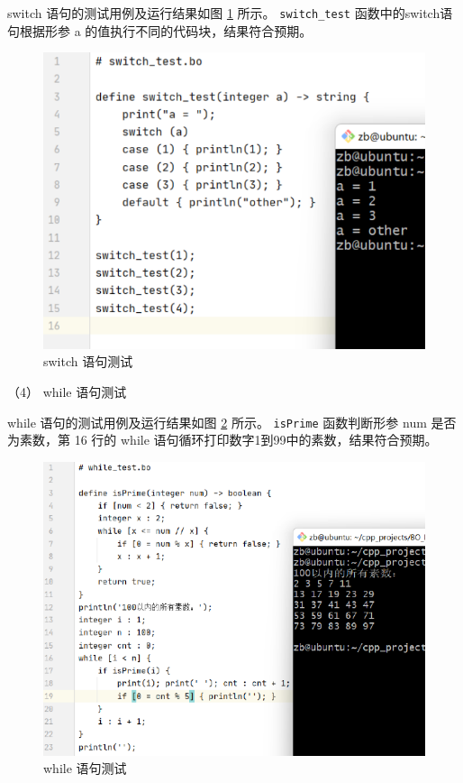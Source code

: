 switch 语句的测试用例及运行结果如图 \ref{fig_test_switch} 所示。 \verb|switch_test| 函数中的switch语句根据形参 a 的值执行不同的代码块，结果符合预期。

\begin{figure}[H]
    \centering\includegraphics{figure/test_switch.pdf}
    \caption{switch 语句测试}
    \label{fig_test_switch}
\end{figure}

（4） while 语句测试

while 语句的测试用例及运行结果如图 \ref{fig_test_while} 所示。 \verb|isPrime| 函数判断形参 num 是否为素数，第 16 行的 while 语句循环打印数字1到99中的素数，结果符合预期。

\begin{figure}[H]
    \centering\includegraphics{figure/test_while.pdf}
    \caption{while 语句测试}
    \label{fig_test_while}
\end{figure}

